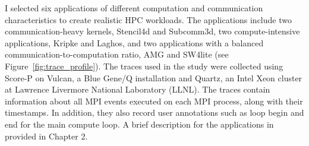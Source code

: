
\label{sec:applicationworkload}

I selected six applications of different computation and communication
characteristics to create realistic HPC workloads. The applications include two
communication-heavy kernels, Stencil4d\cite{bhatele2018evaluating} and Subcomm3d\cite{bhatele2018evaluating}, two compute-intensive
applications, Kripke\cite{kripke} and Laghos\cite{laghos}, and two applications with a balanced
communication-to-computation ratio, AMG\cite{amg} and SW4lite\cite{sjogreen2018sw4} (see
Figure~\ref{fig:trace_profile}).  The traces used in the study were
collected using Score-P \cite{knupfer2012score} on Vulcan, a Blue Gene/Q
installation and Quartz, an Intel Xeon cluster at Lawrence Livermore National
Laboratory (LLNL). The traces contain information about all MPI events executed on each MPI process, along with their
timestamps. In addition, they also record user annotations such as loop
begin and end for the main compute loop. A brief description for the applications in provided in Chapter 2. 

